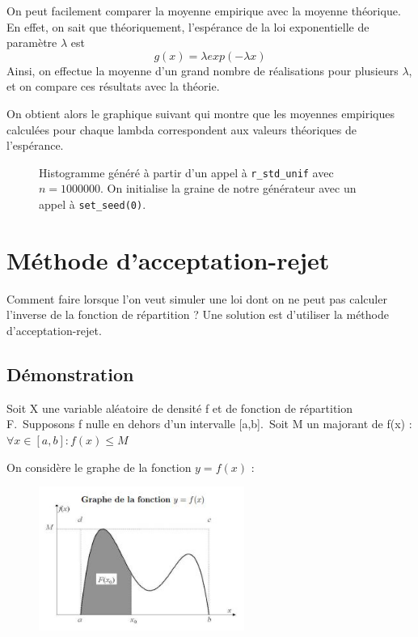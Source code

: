 \documentclass[10pt]{article} %
\begin{document}
On peut facilement comparer la moyenne empirique avec la moyenne théorique. En effet, on sait que théoriquement, l'espérance de la loi exponentielle de paramètre $\lambda$ est $$g(x)=\lambda exp(-\lambda x)$$ Ainsi, on effectue la moyenne d'un grand nombre de réalisations pour plusieurs $\lambda$,  et on compare ces résultats avec la théorie.

On obtient alors le graphique suivant qui montre que les moyennes empiriques calculées pour chaque lambda correspondent aux valeurs théoriques de l'espérance.
\begin{figure}[h!]
    \centering
    
    \vspace{-1cm}
   \caption{Histogramme généré à partir d'un appel à \texttt{r\_std\_unif} avec $n = 1000000$. On initialise la graine de notre
    générateur avec un appel à \texttt{set\_seed(0)}.}

\end{figure}






\section{Méthode d'acceptation-rejet}

Comment faire lorsque l'on veut simuler une loi dont on ne peut pas calculer l'inverse de la fonction de répartition ? Une solution est d'utiliser la méthode d'acceptation-rejet.

\subsection{Démonstration}
Soit X une variable aléatoire de densité f et de fonction de répartition F.\
Supposons f nulle en dehors d'un intervalle [a,b].\
Soit M un majorant de f(x) : $\forall x \in [a,b] : f(x) \leq M$ \

On considère le graphe de la fonction $y = f(x)$ :

\begin{figure}[h!]
    \centering
    \includegraphics[width=0.6\textwidth]{media/Graphe_fonction.jpg}
\end{figure}
\end{document}
